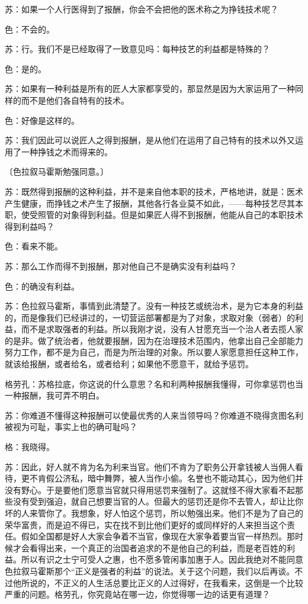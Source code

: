 \documentclass[12pt,oneside]{book}
\begin{document}
苏：如果一个人行医得到了报酬，你会不会把他的医术称之为挣钱技术呢？

色：不会的。

苏：行。我们不是已经取得了一致意见吗：每种技艺的利益都是特殊的？

色：是的。

苏：如果有一种利益是所有的匠人大家都享受的，那显然是因为大家运用了一种同样的而不是他们各自特有的技术。

色：好像是这样的。

苏：我们因此可以说匠人之得到报酬，是从他们在运用了自己特有的技术以外又运用了一种挣钱之术而得来的。

〔色拉叙马霍斯勉强同意。〕

苏：既然得到报酬的这种利益，并不是来自他本职的技术，严格地讲，就是：医术产生健康，而挣钱之术产生了报酬，其他各行各业莫不如此，——每种技艺尽其本职，使受照管的对象得到利益。但是如果匠人得不到报酬，他能从自己的本职技术得到利益吗？

色：看来不能。

苏：那么工作而得不到报酬，那对他自己不是确实没有利益吗？

色：的确没有利益。

苏：色拉叙马霍斯，事情到此清楚了。没有一种技艺或统治术，是为它本身的利益的，而是像我们已经讲过的，一切营运部署都是为了对象，求取对象（弱者）的利益，而不是求取强者的利益。所以我刚才说，没有人甘愿充当一个治人者去揽人家的是非。做了统治者，他就要报酬，因为在治理技术范围内，他拿出自己全部能力努力工作，都不是为自己，而是为所治理的对象。所以要人家愿意担任这种工作，就该给报酬，或者给名，或者给利；如果他不愿意干，就给予惩罚。

格劳孔：苏格拉底，你这说的什么意思？名和利两种报酬我懂得，可你拿惩罚也当一种报酬，我可弄不明白。

苏：你难道不懂得这种报酬可以使最优秀的人来当领导吗？你难道不晓得贪图名利被视为可耻，事实上也的确可耻吗？

格：我晓得。

苏：因此，好人就不肯为名为利来当官。他们不肯为了职务公开拿钱被人当佣人看待，更不肯假公济私，暗中舞弊，被人当作小偷。名誉也不能动其心，因为他们并没有野心。于是要他们愿意当官就只得用惩罚来强制了。这就怪不得大家看不起那些没有受到强迫，就自己想要当官的人。但最大的惩罚还是你不去管人，却让比你坏的人来管你了。我想象，好人怕这个惩罚，所以勉强出来。他们不是为了自己的荣华富贵，而是迫不得已，实在找不到比他们更好的或同样好的人来担当这个责任。假如全国都是好人大家会争着不当官，像现在大家争着要当官一样热烈。那时候才会看得出来，一个真正的治国者追求的不是他自己的利益，而是老百姓的利益。所以有识之士宁可受人之惠，也不愿多管闲事加惠于人。因此我绝对不能同意色拉叙马霍斯那个“正义是强者的利益”的说法。关于这个问题，我们以后再谈。不过他所说的，不正义的人生活总要比正义的人过得好，在我看来，这倒是一个比较严重的问题。格劳孔，你究竟站在哪一边，你觉得哪一边的话更有道理？
\end{document}
